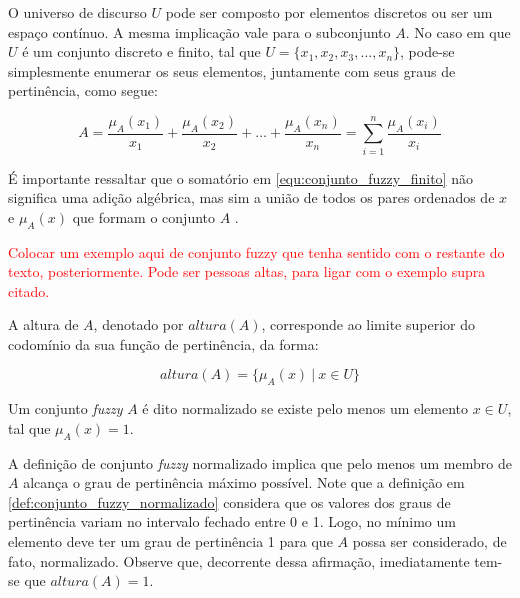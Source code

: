 O universo de discurso $U$ pode ser composto por elementos discretos ou ser um espaço contínuo. A mesma implicação vale para o subconjunto $A$. No caso em que $U$ é um conjunto discreto e finito, tal que $U = \{x_1, x_2, x_3, \ldots, x_n\}$, pode-se simplesmente enumerar os seus elementos, juntamente com seus graus de pertinência, como segue:

\begin{equation}
  A =  \frac{\mu_A(x_1)}{x_1} + \frac{\mu_A(x_2)}{x_2} + \ldots + \frac{\mu_A(x_n)}{x_n} = \sum_{i=1}^n \frac{\mu_A(x_i)}{x_i}
\label{equ:conjunto_fuzzy_finito}
\end{equation}

É importante ressaltar que o somatório em \ref{equ:conjunto_fuzzy_finito} não significa uma adição algébrica, mas sim a união de todos os pares ordenados de $x$ e $\mu_A(x)$ que formam o conjunto $A$ \citep{klir:95}.

\begin{exmp}
\textcolor{red}{Colocar um exemplo aqui de conjunto fuzzy que tenha sentido com o restante do texto, posteriormente. Pode ser pessoas altas, para ligar com o exemplo supra citado.}
\end{exmp}

\begin{defn}
A altura de $A$, denotado por $altura(A)$, corresponde ao limite superior do codomínio da sua função de pertinência, da forma:

\begin{equation}
  altura(A) = \{\mu_A(x) \ |\ x \in U\}
\label{equ:conjunto_fuzzy_altura}
\end{equation}

\end{defn}

\begin{defn}
Um conjunto \emph{fuzzy} $A$ é dito normalizado se existe pelo menos um elemento $x \in U$, tal que $\mu_A(x) = 1$.
\label{def:conjunto_fuzzy_normalizado}
\end{defn}

A definição de conjunto \emph{fuzzy} normalizado implica que pelo menos um membro de $A$ alcança o grau de pertinência máximo possível. Note que a definição em \ref{def:conjunto_fuzzy_normalizado} considera que os valores dos graus de pertinência variam no intervalo fechado entre 0 e 1. Logo, no mínimo um elemento deve ter um grau de pertinência 1 para que $A$ possa ser considerado, de fato, normalizado. Observe que, decorrente dessa afirmação, imediatamente tem-se que $altura(A) = 1$.

